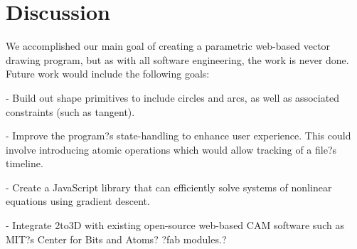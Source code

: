 \section{Discussion}


We accomplished our main goal of creating a parametric web-based vector drawing program, but as with all software engineering, the work is never done. Future work would include the following goals:

- Build out shape primitives to include circles and arcs, as well as associated constraints (such as tangent).

- Improve the program?s state-handling to enhance user experience. This could involve introducing atomic operations which would allow tracking of a file?s timeline.

- Create a JavaScript library that can efficiently solve systems of nonlinear equations using gradient descent.

- Integrate 2to3D with existing open-source web-based CAM software such as MIT?s Center for Bits and Atoms? ?fab modules.?
